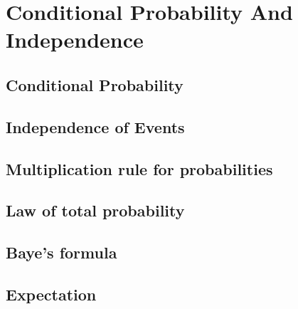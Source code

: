 \documentclass{article}
\begin{document}
\section{Conditional Probability And Independence}
\subsection{Conditional Probability}
\subsection{Independence of Events}
\subsection{Multiplication rule for probabilities}
\subsection{Law of total probability}
\subsection{Baye's formula}
\subsection{Expectation}
\end{document}
